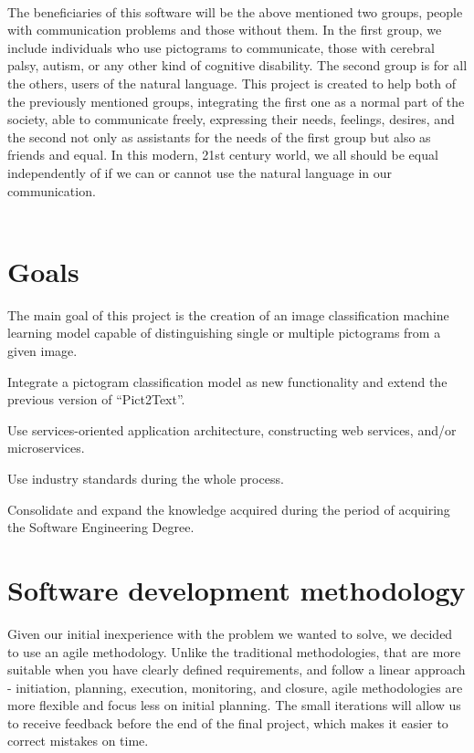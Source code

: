 \\
The beneficiaries of this software will be the above mentioned two groups, people with communication problems and those without them. In the first group, we include individuals who use pictograms to communicate, those with cerebral palsy, autism, or any other kind of cognitive disability. The second group is for all the others, users of the natural language. This project is created to help both of the previously mentioned groups, integrating the first one as a normal part of the society, able to communicate freely, expressing their needs, feelings, desires, and the second not only as assistants for the needs of the first group but also as friends and equal. In this modern, 21st century world, we all should be equal independently of if we can or cannot use the natural language in our communication.
\\
\\
\section{Goals}
The main goal of this project is the creation of an image classification machine learning model capable of distinguishing single or multiple pictograms from a given image. 

Integrate a pictogram classification model as new functionality and extend the previous version of ``Pict2Text''.

Use services-oriented application architecture, constructing web services, and/or microservices.

Use industry standards during the whole process.

Consolidate and expand the knowledge acquired during the period of acquiring the Software Engineering Degree.

\section{Software development methodology}

Given our initial inexperience with the problem we wanted to solve, we decided to use an agile methodology. Unlike the traditional methodologies, that are more suitable when you have clearly defined requirements, and follow a linear approach - initiation, planning, execution, monitoring, and closure, agile methodologies are more flexible and focus less on initial planning. The small iterations will allow us to receive feedback before the end of the final project, which makes it easier to correct mistakes on time. 

